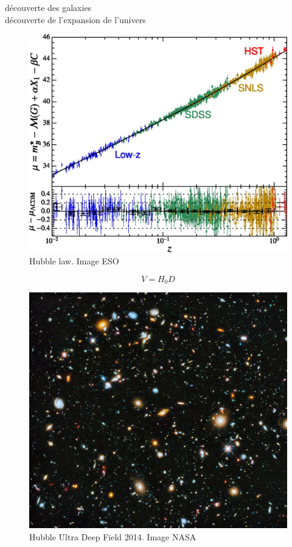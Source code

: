 découverte des galaxies\\
découverte de l'expansion de l'univers


\begin{figure}[bth]
        \includegraphics[width=.9\linewidth]{img/01/hubble_law.jpg} 
        \caption{Hubble law. 
        Image ESO}
 		\label{fig:hubble_law}
\end{figure}

\begin{equation}
V = H_0 D
\end{equation}


\begin{figure}[bth]
        \includegraphics[width=.9\linewidth]{img/01/hudf.jpeg} 
        \caption{Hubble Ultra Deep Field 2014. 
        Image NASA}
 		\label{fig:hubbl_deep_field}
\end{figure}

